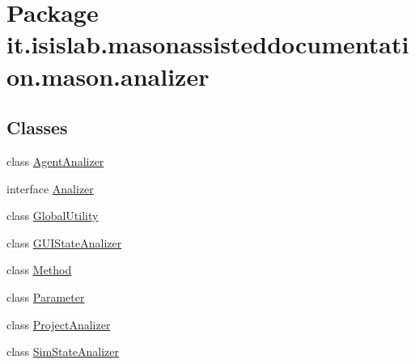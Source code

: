 \hypertarget{namespaceit_1_1isislab_1_1masonassisteddocumentation_1_1mason_1_1analizer}{\section{Package it.\-isislab.\-masonassisteddocumentation.\-mason.\-analizer}
\label{namespaceit_1_1isislab_1_1masonassisteddocumentation_1_1mason_1_1analizer}
}
\subsection*{Classes}
\begin{DoxyCompactItemize}
\item 
class \hyperlink{classit_1_1isislab_1_1masonassisteddocumentation_1_1mason_1_1analizer_1_1_agent_analizer}{Agent\-Analizer}
\item 
interface \hyperlink{interfaceit_1_1isislab_1_1masonassisteddocumentation_1_1mason_1_1analizer_1_1_analizer}{Analizer}
\item 
class \hyperlink{classit_1_1isislab_1_1masonassisteddocumentation_1_1mason_1_1analizer_1_1_global_utility}{Global\-Utility}
\item 
class \hyperlink{classit_1_1isislab_1_1masonassisteddocumentation_1_1mason_1_1analizer_1_1_g_u_i_state_analizer}{G\-U\-I\-State\-Analizer}
\item 
class \hyperlink{classit_1_1isislab_1_1masonassisteddocumentation_1_1mason_1_1analizer_1_1_method}{Method}
\item 
class \hyperlink{classit_1_1isislab_1_1masonassisteddocumentation_1_1mason_1_1analizer_1_1_parameter}{Parameter}
\item 
class \hyperlink{classit_1_1isislab_1_1masonassisteddocumentation_1_1mason_1_1analizer_1_1_project_analizer}{Project\-Analizer}
\item 
class \hyperlink{classit_1_1isislab_1_1masonassisteddocumentation_1_1mason_1_1analizer_1_1_sim_state_analizer}{Sim\-State\-Analizer}
\end{DoxyCompactItemize}
